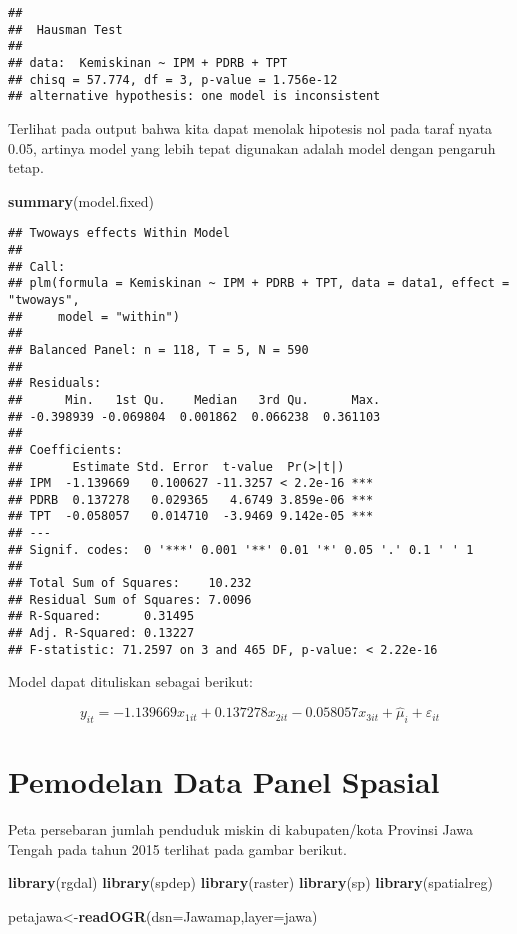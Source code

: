 \documentclass[
]{book}
\newenvironment{Shaded}{\begin{snugshade}}{\end{snugshade}}
\newcommand{\DataTypeTok}[1]{\textcolor[rgb]{0.13,0.29,0.53}{#1}}
\newcommand{\KeywordTok}[1]{\textcolor[rgb]{0.13,0.29,0.53}{\textbf{#1}}}
\newcommand{\NormalTok}[1]{#1}
\newcommand{\StringTok}[1]{\textcolor[rgb]{0.31,0.60,0.02}{#1}}
\begin{document}
\begin{verbatim}
## 
##  Hausman Test
## 
## data:  Kemiskinan ~ IPM + PDRB + TPT
## chisq = 57.774, df = 3, p-value = 1.756e-12
## alternative hypothesis: one model is inconsistent
\end{verbatim}

Terlihat pada output bahwa kita dapat menolak hipotesis nol pada taraf nyata 0.05, artinya model yang lebih tepat digunakan adalah model dengan pengaruh tetap.

\begin{Shaded}
\begin{Highlighting}[]
\KeywordTok{summary}\NormalTok{(model.fixed)}
\end{Highlighting}
\end{Shaded}

\begin{verbatim}
## Twoways effects Within Model
## 
## Call:
## plm(formula = Kemiskinan ~ IPM + PDRB + TPT, data = data1, effect = "twoways", 
##     model = "within")
## 
## Balanced Panel: n = 118, T = 5, N = 590
## 
## Residuals:
##      Min.   1st Qu.    Median   3rd Qu.      Max. 
## -0.398939 -0.069804  0.001862  0.066238  0.361103 
## 
## Coefficients:
##       Estimate Std. Error  t-value  Pr(>|t|)    
## IPM  -1.139669   0.100627 -11.3257 < 2.2e-16 ***
## PDRB  0.137278   0.029365   4.6749 3.859e-06 ***
## TPT  -0.058057   0.014710  -3.9469 9.142e-05 ***
## ---
## Signif. codes:  0 '***' 0.001 '**' 0.01 '*' 0.05 '.' 0.1 ' ' 1
## 
## Total Sum of Squares:    10.232
## Residual Sum of Squares: 7.0096
## R-Squared:      0.31495
## Adj. R-Squared: 0.13227
## F-statistic: 71.2597 on 3 and 465 DF, p-value: < 2.22e-16
\end{verbatim}

Model dapat dituliskan sebagai berikut:

\[y_{it}=-1.139669x_{1it}+0.137278x_{2it}-0.058057x_{3it}+\hat{\mu}_i+\varepsilon_{it}\]

\hypertarget{pemodelan-data-panel-spasial}{%
\section{Pemodelan Data Panel Spasial}\label{pemodelan-data-panel-spasial}}

Peta persebaran jumlah penduduk miskin di kabupaten/kota Provinsi Jawa Tengah pada tahun 2015 terlihat pada gambar berikut.

\begin{Shaded}
\begin{Highlighting}[]
\KeywordTok{library}\NormalTok{(rgdal)}
\KeywordTok{library}\NormalTok{(spdep)}
\KeywordTok{library}\NormalTok{(raster)}
\KeywordTok{library}\NormalTok{(sp)}
\KeywordTok{library}\NormalTok{(spatialreg)}

\NormalTok{petajawa\textless{}{-}}\KeywordTok{readOGR}\NormalTok{(}\DataTypeTok{dsn=}\StringTok{\textquotesingle{}Jawamap\textquotesingle{}}\NormalTok{,}\DataTypeTok{layer=}\StringTok{\textquotesingle{}jawa\textquotesingle{}}\NormalTok{)}
\end{Highlighting}
\end{Shaded}
\end{document}
